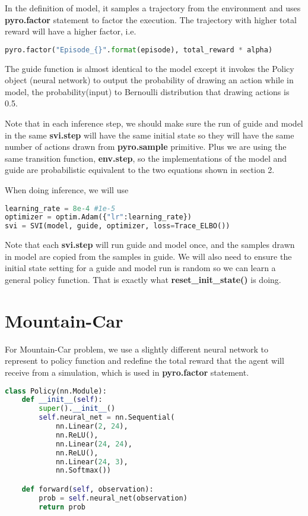 \documentclass[acmsmall,nonacm=true]{acmart}
\begin{document}
In the definition of model, it samples a trajectory from the environment and uses \textbf{pyro.factor} statement to factor the execution. The trajectory with higher total reward will have a higher factor, i.e. 
\begin{lstlisting}[language=Python]
pyro.factor("Episode_{}".format(episode), total_reward * alpha)
\end{lstlisting}

The guide function is almost identical to the model except it invokes the Policy object (neural network) to output the probability of drawing an action while in model, the probability(input) to Bernoulli distribution that drawing actions is 0.5.

Note that in each inference step, we should make sure the run of guide and model in the same \textbf{svi.step} will have the same initial state so they will have the same number of actions drawn from \textbf{pyro.sample} primitive. Plus we are using the same transition function, \textbf{env.step}, so the implementations of the model and guide are probabilistic equivalent to the two equations shown in section 2.

When doing inference, we will use 
\begin{lstlisting}[language=Python]
learning_rate = 8e-4 #1e-5
optimizer = optim.Adam({"lr":learning_rate})
svi = SVI(model, guide, optimizer, loss=Trace_ELBO())
\end{lstlisting}

Note that each \textbf{svi.step} will run guide and model once, and the samples drawn in model are copied from the samples in guide. We will also need to ensure the initial state setting for a guide and model run is random so we can learn a general policy function. That is exactly what \textbf{reset\_init\_state()} is doing.

\section{Mountain-Car}
For Mountain-Car problem, we use a slightly different neural network to represent to policy function and redefine the total reward that the agent will receive from a simulation, which is used in \textbf{pyro.factor} statement.
\begin{lstlisting}[language=Python]
class Policy(nn.Module):
    def __init__(self):
        super().__init__()
        self.neural_net = nn.Sequential(
            nn.Linear(2, 24),
            nn.ReLU(),
            nn.Linear(24, 24),
            nn.ReLU(),
            nn.Linear(24, 3),
            nn.Softmax())

    def forward(self, observation):
        prob = self.neural_net(observation)
        return prob
\end{lstlisting}
\end{document}
